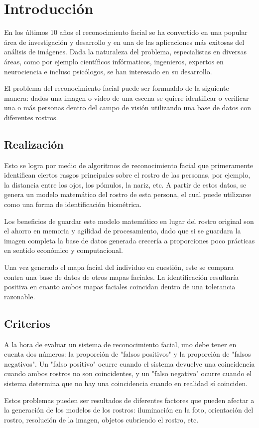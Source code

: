 \chapter{Introducción}

En los últimos 10 años el reconocimiento facial se ha convertido en una popular área de investigación y desarrollo y en una de las aplicaciones más exitosas del análisis de imágenes. Dada la naturaleza del problema, especialistas en diversas áreas, como por ejemplo científicos infórmaticos, ingenieros, expertos en neurociencia e incluso psicólogos, se han interesado en su desarrollo.  

El problema del reconocimiento facial puede ser formualdo de la siguiente manera: dados una imagen o video de una escena se quiere identificar o verificar una o más personas dentro del campo de visión utilizando una base de datos con diferentes rostros. 


\section{Realización}

Esto se logra por medio de algoritmos de reconocimiento facial que primeramente identifican ciertos rasgos principales sobre el rostro de las personas, por ejemplo, la distancia entre los ojos, los pómulos, la nariz, etc. A partir de estos datos, se genera un modelo matemático del rostro de esta persona, el cual puede utilizarse como una forma de identificación biométrica.

Los beneficios de guardar este modelo matemático en lugar del rostro original son el ahorro en memoria y agilidad de procesamiento, dado que si se guardara la imagen completa la base de datos generada crecería a proporciones poco prácticas en sentido económico y computacional.

Una vez generado el mapa facial del individuo en cuestión, este se compara contra una base de datos de otros mapas faciales. La identificación resultaría positiva en cuanto ambos mapas faciales coincidan dentro de una tolerancia razonable.

\section{Criterios}

A la hora de evaluar un sistema de reconocimiento facial, uno debe tener en cuenta dos números: la proporción de "falsos positivos" y la proporción de "falsos negativos". Un "falso positivo" ocurre cuando el sistema devuelve una coincidencia cuando ambos rostros no son coincidentes, y un "falso negativo" ocurre cuando el sistema determina que no hay una coincidencia cuando en realidad sí coinciden.

Estos problemas pueden ser resultados de diferentes factores que pueden afectar a la generación de los modelos de los rostros: iluminación en la foto, orientación del rostro, resolución de la imagen, objetos cubriendo el rostro, etc.